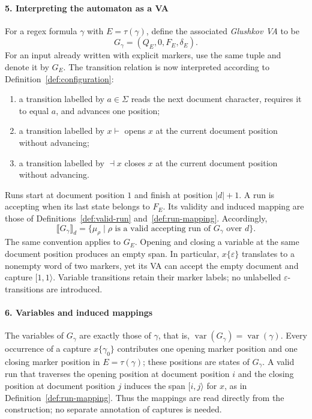 \paragraph{5. Interpreting the automaton as a VA}
For a regex formula $\gamma$ with $E=\tau(\gamma)$, define the
associated \emph{Glushkov VA} to be
\[
 G_\gamma=(Q_E,0,F_E,\delta_E).
\]
For an input already written with explicit markers, use the same tuple
and denote it by $G_E$.
The transition relation is now interpreted according to
Definition~\ref{def:configuration}:
\begin{enumerate}
 \item a transition labelled by $a\in\Sigma$ reads the next document
       character, requires it to equal $a$, and advances one position;
 \item a transition labelled by $x\vdash$ opens $x$ at the current
       document position without advancing;
 \item a transition labelled by $\dashv x$ closes $x$ at the current
       document position without advancing.
\end{enumerate}
Runs start at document position $1$ and finish at position $|d|+1$.
A run is accepting when its last state belongs to $F_E$.
Its validity and induced mapping are those of
Definitions~\ref{def:valid-run} and~\ref{def:run-mapping}. Accordingly,
\[
 \llbracket G_\gamma\rrbracket_d
 =\{\mu_\rho\mid\rho\text{ is a valid accepting run of }G_\gamma
                       \text{ over }d\}.
\]
The same convention applies to $G_E$. Opening and closing a variable at
the same document position produces an empty span. In particular,
$x\{\varepsilon\}$ translates to a nonempty word of two markers, yet
its VA can accept the empty document and capture $[1,1\rangle$.
Variable transitions retain their marker labels; no unlabelled
$\varepsilon$-transitions are introduced.

\paragraph{6. Variables and induced mappings}
The variables of $G_\gamma$ are exactly those of $\gamma$, that is,
$\operatorname{var}(G_\gamma)=\operatorname{var}(\gamma)$. Every
occurrence of a capture $x\{\gamma_0\}$ contributes one opening marker
position and one closing marker position in $E=\tau(\gamma)$; these
positions are states of $G_\gamma$. A valid run that traverses the
opening position at document position $i$ and the closing position at
document position $j$ induces the span $[i,j\rangle$ for $x$, as in
Definition~\ref{def:run-mapping}. Thus the mappings are read directly
from the construction; no separate annotation of captures is needed.

